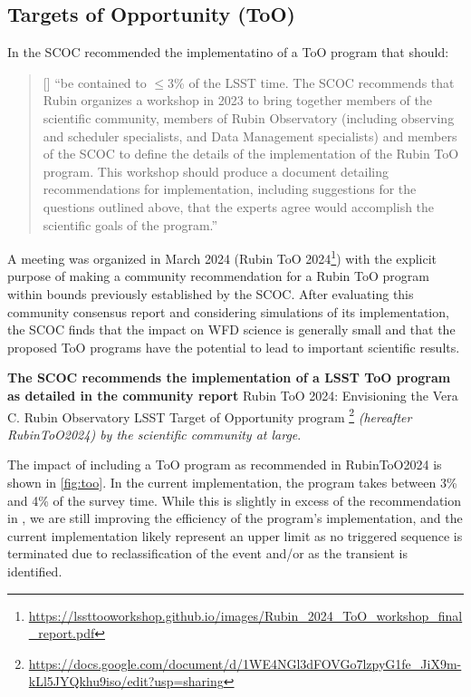 \FloatBarrier





\subsection{Targets of Opportunity (ToO)}\label{sec:ToO}
 
In  the SCOC recommended the implementatino of a ToO program that should:

\begin{quote}
    
[] ``be contained to $\leq$3\% of the LSST time. The SCOC recommends that Rubin organizes a workshop in 2023 to bring together members of the scientific community, members of Rubin Observatory (including observing and scheduler specialists, and Data Management specialists) and members of the SCOC to define the details of the implementation of the Rubin ToO program. This workshop should produce a document detailing recommendations for implementation, including suggestions for the questions outlined above, that the experts agree would accomplish the scientific goals of the program.''
\end{quote}

A meeting was organized in March 2024 (Rubin ToO 2024\footnote{\url{https://lssttooworkshop.github.io/images/Rubin_2024_ToO_workshop_final_report.pdf}}) with the explicit purpose of making a community recommendation for a Rubin ToO program within bounds previously established by the SCOC. After evaluating this community consensus report and considering simulations of its implementation, the SCOC finds that the impact on WFD science is generally small and that the proposed ToO programs have the potential to lead to important scientific results. 

 {\bf The SCOC recommends the implementation of a LSST ToO program as detailed in the community report} Rubin ToO 2024: 
Envisioning the Vera C. Rubin Observatory LSST Target of Opportunity program
\footnote{\url{https://docs.google.com/document/d/1WE4NGl3dFOVGo7lzpyG1fe_JiX9m-kLl5JYQkhu9iso/edit?usp=sharing}} \emph{(hereafter RubinToO2024) by the scientific community at large}. 

The impact of including a ToO program as recommended in RubinToO2024 is shown in \autoref{fig:too}. In the current implementation, the program takes between 3\% and 4\% of the survey time. While this is slightly in excess of the recommendation in , we are still improving the efficiency of the program's implementation, and the current implementation likely represent an upper limit as no triggered sequence is terminated due to reclassification of the event and/or as the transient is identified.

